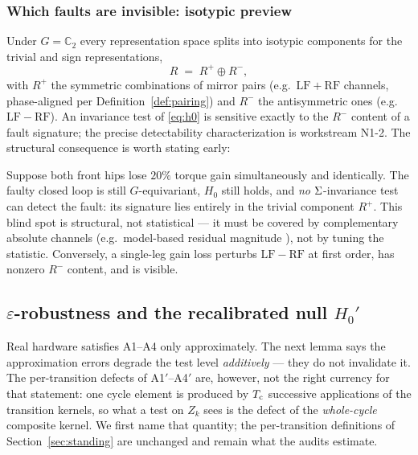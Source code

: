 \subsubsection{Which faults are invisible: isotypic preview}
\label{sec:isotypic}

Under $G = \mathbb{C}_2$ every representation space splits into isotypic
components for the trivial and sign representations,
\[
  R \;=\; R^{+} \oplus R^{-},
\]
with $R^{+}$ the symmetric combinations of mirror pairs (e.g.\
$\mathrm{LF} + \mathrm{RF}$ channels, phase-aligned per
Definition~\ref{def:pairing}) and $R^{-}$ the antisymmetric ones
(e.g.\ $\mathrm{LF} - \mathrm{RF}$). An invariance test of \eqref{eq:h0} is
sensitive exactly to the $R^{-}$ content of a fault signature; the precise
detectability characterization is workstream N1-2. The structural consequence
is worth stating early:

\begin{example}
\label{ex:bilateral}
Suppose both front hips lose $20\%$ torque gain simultaneously and
identically. The faulty closed loop is still $G$-equivariant, $H_0$ still
holds, and \emph{no} $\Sigma$-invariance test can detect the fault: its
signature lies entirely in the trivial component $R^{+}$. This blind spot is
structural, not statistical --- it must be covered by complementary absolute
channels (e.g.\ model-based residual magnitude
\cite{haddadin2017robot,evangelisti2024datadriven}), not by tuning the
statistic. Conversely, a single-leg gain loss perturbs
$\mathrm{LF} - \mathrm{RF}$ at first order, has nonzero $R^{-}$ content, and
is visible.
\end{example}

\subsection{$\varepsilon$-robustness and the recalibrated null $H_0'$}
\label{sec:h0prime}

Real hardware satisfies A1--A4 only approximately. The next lemma says the
approximation errors degrade the test level \emph{additively} --- they do not
invalidate it. The per-transition defects of A1$'$--A4$'$ are, however, not
the right currency for that statement: one cycle element is produced by
$T_{\mathrm{c}}$ successive applications of the transition kernels, so what a test on
$Z_k$ sees is the defect of the \emph{whole-cycle} composite kernel. We first
name that quantity; the per-transition definitions of
Section~\ref{sec:standing} are unchanged and remain what the audits estimate.

